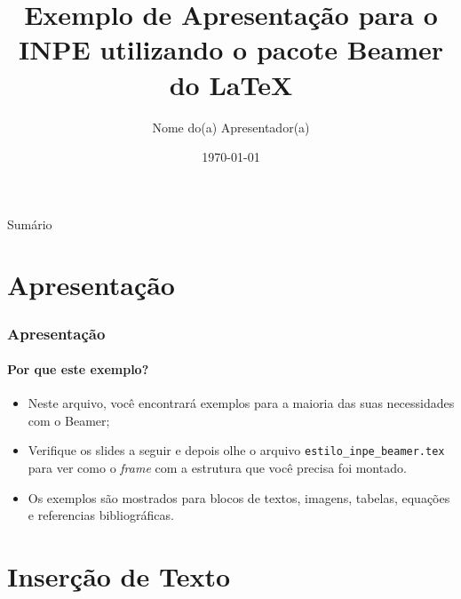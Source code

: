 \documentclass[10pt,aspectratio=169]{beamer}
\title{Exemplo de Apresentação para o INPE utilizando o pacote Beamer do \LaTeX}
\author{Nome do(a) Apresentador(a)}
\institute{Instituto Nacional de Pesquisas Espaciais}
\date{
	\today 
}
\begin{document}
{
\begin{frame}
	\vspace{1cm}
	\titlepage
\end{frame}
}
 
\addtocounter{framenumber}{-1}
 
\begin{frame}{Sumário}
	\tableofcontents
\end{frame}


\section{Apresentação}

\begin{frame}
\frametitle{Apresentação}
\framesubtitle{Por que este exemplo?}
\begin{itemize}
	\item Neste arquivo, você encontrará exemplos para a maioria das suas necessidades com o Beamer;
	\pause
	\item Verifique os slides a seguir e depois olhe o arquivo {\tt estilo\_inpe\_beamer.tex} para ver como o \textit{frame} com a estrutura que você precisa foi montado.
	\pause
	\item Os exemplos são mostrados para blocos de textos, imagens, tabelas, equações e referencias bibliográficas.
\end{itemize}
\end{frame}

\section{Inserção de Texto}
\end{document}
